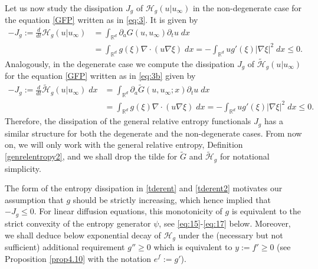 \documentclass[reqno]{amsart}
\newcommand{\R}{\mathbb{R}}
\begin{document}
Let us now study the dissipation $J_g$ of $\mathcal{H}_g(u|u_\infty)$ in the non-degenerate case for the equation \eqref{GFP} written as in \eqref{eq:3}. It is given by
\begin{align}
  -J_g:=\frac{d}{dt}\mathcal{H}_g(u|u_\infty)&= \int_{\R^d} \partial_a G (u,u_\infty)\partial_tu \;dx\nonumber \\
  &= \int_{\R^d} g(\xi)\nabla\cdot(u\nabla\xi)\;dx = -\int_{\R^d} ug'(\xi)|\nabla\xi|^2\;dx \leq 0.
\label{tderent}
\end{align}
Analogously, in the degenerate case we compute the dissipation $J_g$ of $\widetilde{\mathcal{H}}_g(u|u_\infty)$ for the equation \eqref{GFP} written as in \eqref{eq:3b} given by
\begin{align}
  -J_g:=\frac{d}{dt}\widetilde{\mathcal{H}}_g(u|u_\infty)\;dx&= \int_{\R^d} \partial_a \tilde G (u,u_\infty;x)\partial_tu \;dx\nonumber\\
  &= \int_{\R^d} g(\xi)\nabla\cdot(u\nabla\xi)\;dx = -\int_{\R^d} ug'(\xi)|\nabla\xi|^2 \;dx\leq 0.
\label{tderent2}
\end{align}
Therefore, the dissipation of the general relative entropy functionals $J_g$ has a similar structure for both the degenerate and the non-degenerate cases. From now on, we will only work with the general relative entropy, Definition \ref{genrelentropy2}, and we shall drop the tilde for $\tilde G$ and $\widetilde{\mathcal{H}}_g$ for notational simplicity.

The form of the entropy dissipation in \eqref{tderent} and \eqref{tderent2} motivates our assumption that $g$ should be strictly increasing, which hence implied that $-J_g\le0$. For linear diffusion equations, this monotonicity of $g$ is equivalent to the strict convexity of the entropy generator $\psi$, see \eqref{eq:15}-\eqref{eq:17} below. Moreover, we shall deduce below exponential decay of $\mathcal{H}_g$ under the (necessary but not sufficient) additional requirement $g''\ge0$ which is equivalent to $y:=f'\ge0$ (see Proposition \ref{prop4.10} with the notation $e^f:=g'$). 
\end{document}
